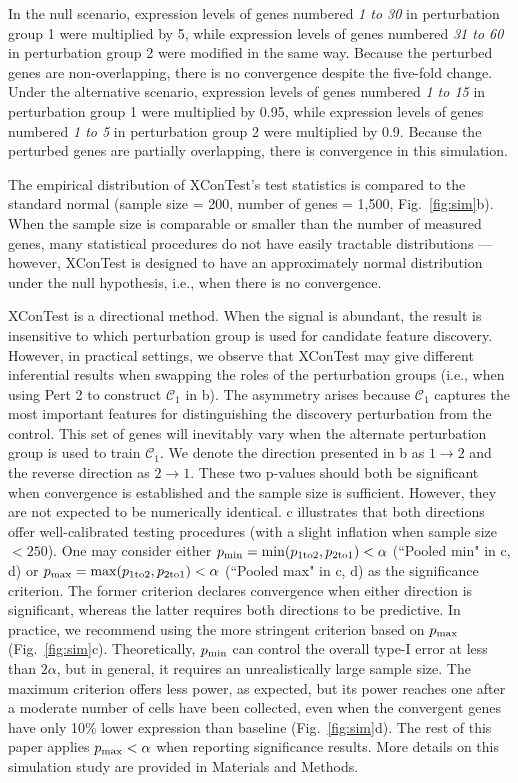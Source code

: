 \documentclass[11pt]{article}
\begin{document}
In the null scenario, expression levels of genes numbered \textit{1 to 30} in perturbation group 1 were multiplied by 5, while expression levels of genes numbered \textit{31 to 60} in perturbation group 2 were modified in the same way. Because the perturbed genes are non-overlapping, there is no convergence despite the five-fold change. Under the alternative scenario, expression levels of genes numbered \textit{1 to 15} in perturbation group 1 were multiplied by 0.95, while expression levels of genes numbered \textit{1 to 5} in perturbation group 2 were multiplied by 0.9. Because the perturbed genes are partially overlapping, there is convergence in this simulation.

The empirical distribution of XConTest's test statistics is compared to the standard normal (sample size = 200, number of genes = 1,500, Fig.~\ref{fig:sim}b). When the sample size is comparable or smaller than the number of measured genes, many statistical procedures do not have easily tractable distributions 
---however, XConTest is designed to have an approximately normal distribution under the null hypothesis, i.e., when there is no convergence.

XConTest is a directional method. When the signal is abundant, the result is insensitive to which perturbation group is used for candidate feature discovery. However, in practical settings, we observe that XConTest may give different inferential results when swapping the roles of the perturbation groups (i.e., when using Pert 2 to construct $\mathcal{C}_1$ in b). The asymmetry arises because $\mathcal{C}_1$ captures the most important features for distinguishing the discovery perturbation from the control. This set of genes will inevitably vary when the alternate perturbation group is used to train $\mathcal{C}_1$. We denote the direction presented in b as $1\rightarrow 2$ and the reverse direction as $2\rightarrow 1$. These two p-values should both be significant when convergence is established and the sample size is sufficient. However, they are not expected to be numerically identical.
 c illustrates that both directions offer well-calibrated testing procedures (with a slight inflation when sample size $<250$). One may consider either $p_{\rm min} = \min(p_{\rm 1to2},p_{\rm 2to1}) < \alpha$ (``Pooled min" in c, d) or $p_{\rm max} = \max(p_{\rm 1to2},p_{\rm 2to1}) < \alpha$ (``Pooled max" in c, d) as the significance criterion. The former criterion declares convergence when either direction is significant, whereas the latter requires both directions to be predictive. In practice, we recommend using the more stringent criterion based on $p_{\rm max}$ (Fig.~\ref{fig:sim}c). Theoretically, $p_{\rm min}$ can control the overall type-I error at less than $2\alpha$, but in general, it requires an unrealistically large sample size. The maximum criterion offers less power, as expected, but its power reaches one after a moderate number of cells have been collected, even when the convergent genes have only 10\% lower expression than baseline (Fig.~\ref{fig:sim}d). The rest of this paper applies $p_{\rm max} < \alpha$ when reporting significance results. More details on this simulation study are provided in Materials and Methods.
\end{document}
